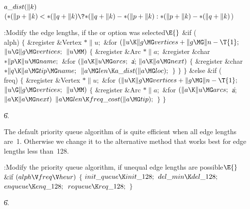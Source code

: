 \Y\B\4\D$\\{a\_dist}(\|k)$ \5
$({*}(\|p+\|k)<{*}(\|q+\|k)\?{*}(\|q+\|k)-{*}(\|p+\|k):{*}(\|p+\|k)-{*}(\|q+%
\|k){}$)\par
\Y\B\4:Modify the edge lengths, if the  or  option
was selected\X${}\E{}$\6
\&{if} (\\{alph})\5
${}\{{}$\5
\1\&{register} \&{Vertex} ${}{*}\|u;{}$\7
\&{for} ${}(\|u\K\|g\MG\\{vertices}+\|g\MG\|n-\T{1};{}$ ${}\|u\G\|g\MG%
\\{vertices};{}$ ${}\|u\MM){}$\5
${}\{{}$\5
\1\&{register} \&{Arc} ${}{*}\|a;{}$\6
\&{register} \&{char} ${}{*}\|p\K\|u\MG\\{name};{}$\7
\&{for} ${}(\|a\K\|u\MG\\{arcs};{}$ \|a; ${}\|a\K\|a\MG\\{next}){}$\5
${}\{{}$\5
\1\&{register} \&{char} ${}{*}\|q\K\|a\MG\\{tip}\MG\\{name};{}$\7
${}\|a\MG\\{len}\K\\{a\_dist}(\|a\MG\\{loc});{}$\6
\4${}\}{}$\2\6
\4${}\}{}$\2\6
\4${}\}{}$\5
\2\&{else} \&{if} (\\{freq})\5
${}\{{}$\5
\1\&{register} \&{Vertex} ${}{*}\|u;{}$\7
\&{for} ${}(\|u\K\|g\MG\\{vertices}+\|g\MG\|n-\T{1};{}$ ${}\|u\G\|g\MG%
\\{vertices};{}$ ${}\|u\MM){}$\5
${}\{{}$\5
\1\&{register} \&{Arc} ${}{*}\|a;{}$\7
\&{for} ${}(\|a\K\|u\MG\\{arcs};{}$ \|a; ${}\|a\K\|a\MG\\{next}){}$\1\5
${}\|a\MG\\{len}\K\\{freq\_cost}(\|a\MG\\{tip});{}$\2\6
\4${}\}{}$\2\6
\4${}\}{}$\2\par
\U6.\fi

The default priority queue algorithm of  is quite
efficient
when all edge lengths are~1. Otherwise we change it to the
alternative method that works best for edge lengths less than~128.

\Y\B\4:Modify the priority queue algorithm, if unequal edge lengths are
possible\X${}\E{}$\6
\&{if} ${}(\\{alph}\V\\{freq}\V\\{heur}){}$\5
${}\{{}$\1\6
${}\\{init\_queue}\K\\{init\_128};{}$\6
${}\\{del\_min}\K\\{del\_128};{}$\6
${}\\{enqueue}\K\\{enq\_128};{}$\6
${}\\{requeue}\K\\{req\_128};{}$\6
\4${}\}{}$\2\par
\U6.\fi

